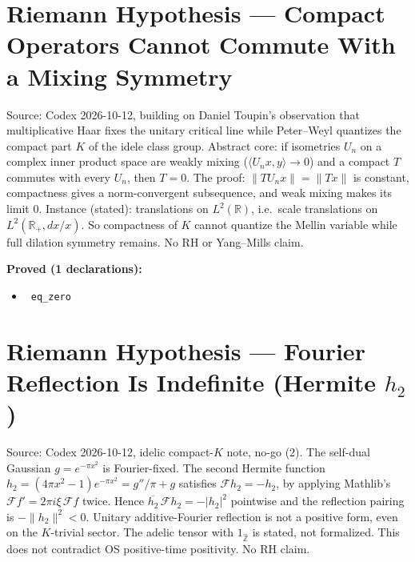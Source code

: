 \documentclass{report}
\theoremstyle{definition}
\begin{document}
\section{Riemann Hypothesis --- Compact Operators Cannot Commute With a Mixing Symmetry}
Source: Codex 2026-10-12, building on Daniel Toupin's observation that multiplicative Haar fixes the unitary critical line while Peter--Weyl quantizes the compact part $K$ of the idele class group. Abstract core: if isometries $U_n$ on a complex inner product space are weakly mixing ($\langle U_nx,y\rangle\to0$) and a compact $T$ commutes with every $U_n$, then $T=0$. The proof: $\|T U_nx\|=\|Tx\|$ is constant, compactness gives a norm-convergent subsequence, and weak mixing makes its limit $0$. Instance (stated): translations on $L^2(\mathbb R)$, i.e.\ scale translations on $L^2(\mathbb R_+,dx/x)$. So compactness of $K$ cannot quantize the Mellin variable while full dilation symmetry remains. No RH or Yang--Mills claim.

\noindent\textbf{Proved (1 declarations):}
\begin{itemize}
  \item {}\leanok\ \texttt{eq\_zero}
\end{itemize}

\section{Riemann Hypothesis --- Fourier Reflection Is Indefinite (Hermite $h_2$)}
Source: Codex 2026-10-12, idelic compact-$K$ note, no-go (2). The self-dual Gaussian $g=e^{-\pi x^2}$ is Fourier-fixed. The second Hermite function $h_2=(4\pi x^2-1)e^{-\pi x^2}=g''/\pi+g$ satisfies $\mathcal F h_2=-h_2$, by applying Mathlib's $\mathcal F f'=2\pi i\xi\,\mathcal Ff$ twice. Hence $\overline{h_2}\,\mathcal Fh_2=-|h_2|^2$ pointwise and the reflection pairing is $-\|h_2\|^2<0$. Unitary additive-Fourier reflection is not a positive form, even on the $K$-trivial sector. The adelic tensor with $1_{\hat{\mathbb Z}}$ is stated, not formalized. This does not contradict OS positive-time positivity. No RH claim.
\end{document}
